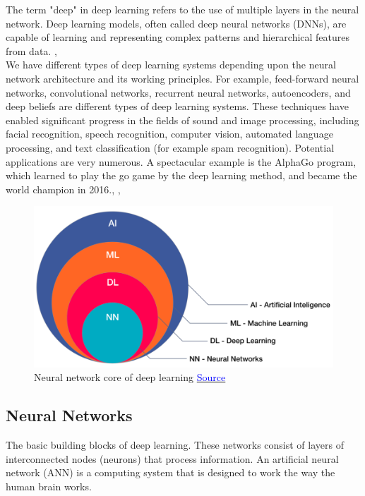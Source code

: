The term "deep" in deep learning refers to the use of multiple layers in the neural network. Deep learning models, often called deep neural networks (DNNs), are capable of learning and representing complex patterns and hierarchical features from data. \cite{nielsen2015neural} \cite{Arnold2011AnIT}, \cite{2015Natur.521..436L} \\

We have different types of deep learning systems depending upon the neural network architecture and its working principles. For example, feed-forward neural networks, convolutional networks, recurrent neural networks, autoencoders, and deep beliefs are different types of deep learning systems.
These techniques have enabled significant progress in the fields of sound and image processing, including facial recognition, speech recognition, computer
vision, automated language processing, and text classification (for example spam recognition). Potential applications are very numerous. A spectacular example is the AlphaGo program, which learned to play the go game by the deep learning method, and became the world champion in 2016.\cite{koons2005}, \cite{shinde2018review}, \cite{choi2020introduction}
\begin{figure}[H]
    \centering
    \includegraphics[width=0.8\linewidth]{tex/img/NN_DL_ML.png}
    \caption{Neural network core of deep learning \protect\href{https://intellipaat.com/community/9868/what-is-the-difference-between-deep-learning-and-traditional-artificial-neural-network-machine-learning}{\textcolor{blue}{Source}}}
    \label{fig:NN_DL}
\end{figure}

\subsection{Neural Networks}
The basic building blocks of deep learning. These networks consist of layers of interconnected nodes (neurons) that process information.
An artificial neural network (ANN) is a computing system that is designed to work the way the human brain works.


